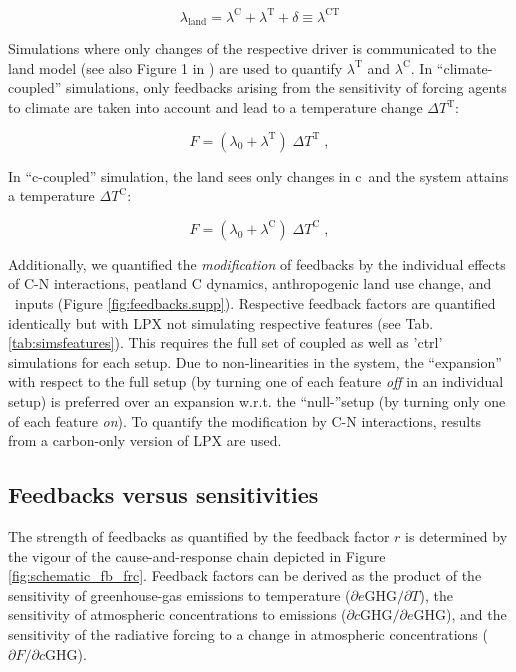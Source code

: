 \begin{equation}
\label{eq:rCT}
  \lambda_{\text{land}}=\lambda^{\text{C}}+\lambda^{\text{T}}+\delta \equiv \lambda^{\text{CT}}
\end{equation}

Simulations where only changes of the respective driver is communicated to the land model (see also Figure 1 in \citet{stocker13natcc}) are used to quantify $\lambda^{\text{T}}$  and $\lambda^{\text{C}}$. In ``climate-coupled'' simulations, only feedbacks arising from the sensitivity of forcing agents to climate are taken into account and lead to a temperature change $\Delta T^{\text{T}}$:

\begin{equation}
   F = ( \lambda_0 + \lambda^{\text{T}}) \; \Delta T^{\text{T}} \;,
\end{equation}

In ``c\coo -coupled'' simulation, the land sees only changes in c\coo\ and the system attains a temperature $\Delta T^{\text{C}}$:

\begin{equation}
   F = ( \lambda_0 + \lambda^{\text{C}}) \; \Delta T^{\text{C}} \;,
\end{equation}

Additionally, we quantified the {\it modification} of feedbacks by the individual effects of C-N interactions, peatland C dynamics, anthropogenic land use change, and \nr\ inputs (Figure \ref{fig:feedbacks.supp}). Respective feedback factors are quantified identically but with LPX not simulating respective features (see Tab. \ref{tab:simsfeatures}). This requires the full set of coupled as well as 'ctrl' simulations for each setup. Due to non-linearities in the system, the ``expansion'' with respect to the full setup (by turning one of each feature {\it off} in an individual setup) is preferred over an expansion w.r.t. the ``null-''setup (by turning only one of each feature {\it on}). To quantify the modification by C-N interactions, results from a carbon-only version of LPX are used.

\subsection{Feedbacks versus sensitivities}
\label{sec:sensitivities}
The strength of feedbacks as quantified by the feedback factor $r$ is determined by the vigour of the cause-and-response chain depicted in Figure \ref{fig:schematic_fb_frc}. Feedback factors can be derived as the product of the sensitivity of greenhouse-gas emissions to temperature ($\partial e\text{GHG}/\partial T$), the sensitivity of atmospheric concentrations to emissions ($\partial c\text{GHG}/\partial e\text{GHG}$), and the sensitivity of the radiative forcing to a change in atmospheric concentrations ($\partial F/\partial c\text{GHG}$).

